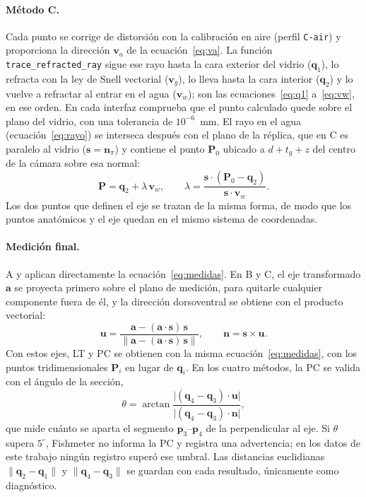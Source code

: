 \paragraph{Método C.} Cada punto se corrige de distorsión con la calibración en aire (perfil \texttt{C-air}) y proporciona la dirección $\mathbf{v}_a$ de la ecuación~\eqref{eq:va}. La función \texttt{trace\_refracted\_ray} sigue ese rayo hasta la cara exterior del vidrio ($\mathbf{q}_1$), lo refracta con la ley de Snell vectorial ($\mathbf{v}_g$), lo lleva hasta la cara interior ($\mathbf{q}_2$) y lo vuelve a refractar al entrar en el agua ($\mathbf{v}_w$); son las ecuaciones~\eqref{eq:q1} a~\eqref{eq:vw}, en ese orden. En cada interfaz comprueba que el punto calculado quede sobre el plano del vidrio, con una tolerancia de $10^{-6}$~mm. El rayo en el agua (ecuación~\ref{eq:rayo}) se interseca después con el plano de la réplica, que en C es paralelo al vidrio ($\mathbf{s} = \mathbf{n}_\pi$) y contiene el punto $\mathbf{P}_0$ ubicado a $d + t_g + z$ del centro de la cámara sobre esa normal:
\begin{equation}
\mathbf{P} = \mathbf{q}_2 + \lambda\,\mathbf{v}_w, \qquad \lambda = \frac{\mathbf{s}\cdot(\mathbf{P}_0 - \mathbf{q}_2)}{\mathbf{s}\cdot\mathbf{v}_w} .
\label{eq:interseccion-c}
\end{equation}
Los dos puntos que definen el eje se trazan de la misma forma, de modo que los puntos anatómicos y el eje quedan en el mismo sistema de coordenadas.

\paragraph{Medición final.} A y \Aprime{} aplican directamente la ecuación~\eqref{eq:medidas}. En B y C, el eje transformado $\mathbf{a}$ se proyecta primero sobre el plano de medición, para quitarle cualquier componente fuera de él, y la dirección dorsoventral se obtiene con el producto vectorial:
\begin{equation}
\mathbf{u} = \frac{\mathbf{a} - (\mathbf{a}\cdot\mathbf{s})\,\mathbf{s}}{\lVert \mathbf{a} - (\mathbf{a}\cdot\mathbf{s})\,\mathbf{s} \rVert}, \qquad
\mathbf{n} = \mathbf{s} \times \mathbf{u} .
\label{eq:ejes-3d}
\end{equation}
Con estos ejes, LT y PC se obtienen con la misma ecuación~\eqref{eq:medidas}, con los puntos tridimensionales $\mathbf{P}_i$ en lugar de $\mathbf{q}_i$. En los cuatro métodos, la PC se valida con el ángulo de la sección,
\begin{equation}
\theta = \arctan\frac{\lvert (\mathbf{q}_4 - \mathbf{q}_3)\cdot\mathbf{u} \rvert}{\lvert (\mathbf{q}_4 - \mathbf{q}_3)\cdot\mathbf{n} \rvert},
\label{eq:angulo-seccion}
\end{equation}
que mide cuánto se aparta el segmento $\mathbf{p}_3$--$\mathbf{p}_4$ de la perpendicular al eje. Si $\theta$ supera $5^{\circ}$, Fishmeter no informa la PC y registra una advertencia; en los datos de este trabajo ningún registro superó ese umbral. Las distancias euclidianas $\lVert \mathbf{q}_2 - \mathbf{q}_1 \rVert$ y $\lVert \mathbf{q}_4 - \mathbf{q}_3 \rVert$ se guardan con cada resultado, únicamente como diagnóstico.

